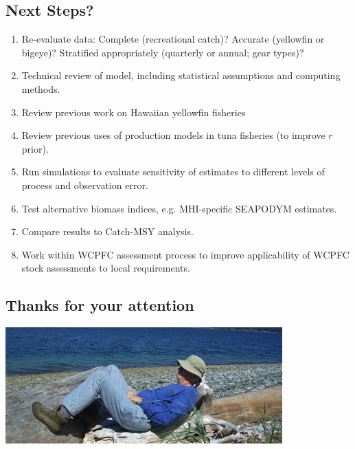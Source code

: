 \documentclass[letterpaper,KOMA,landscape,titlepage]{powersem}
\begin{document}
\begin{slide}\section{Next Steps?}
\begin{enumerate}
\item Re-evaluate data: Complete (recreational catch)? Accurate (yellowfin or
bigeye)? Stratified appropriately (quarterly or annual; gear types)?
\item Technical review of model, including statistical assumptions
and computing methods.
\item Review previous work on Hawaiian yellowfin fisheries
\item Review previous uses of production models in tuna fisheries
(to improve $r$ prior).
\item Run simulations to evaluate sensitivity of estimates to
different levels of process and observation error.
\item Test alternative biomass indices, e.g. MHI-specific
SEAPODYM estimates.
\item Compare results to Catch-MSY analysis. 
\item Work within WCPFC assessment process to improve applicability of
WCPFC stock assessments to local requirements.
\end{enumerate}
\end{slide}

\begin{slide}\section{Thanks for your attention}
\begin{center}
\includegraphics[width=0.8\textwidth]{./graphics/recumbant.png}
\end{center}
\end{slide}
\end{document}
